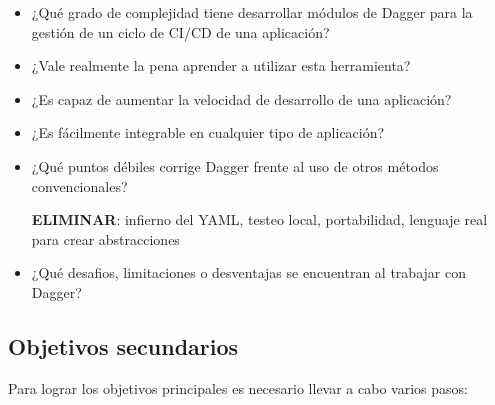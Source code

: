 \begin{itemize}
  \item ¿Qué grado de complejidad tiene desarrollar módulos de Dagger para la gestión de un ciclo de CI/CD de una aplicación?
  \item ¿Vale realmente la pena aprender a utilizar esta herramienta?
  \item ¿Es capaz de aumentar la velocidad de desarrollo de una aplicación?
  \item ¿Es fácilmente integrable en cualquier tipo de aplicación?
  \item ¿Qué puntos débiles corrige Dagger frente al uso de otros métodos convencionales?

    \textbf{ELIMINAR}: infierno del YAML, testeo local, portabilidad, lenguaje real para crear abstracciones
  \item ¿Qué desafios, limitaciones o desventajas se encuentran al trabajar con Dagger?
\end{itemize}

\subsection*{Objetivos secundarios}

Para lograr los objetivos principales es necesario llevar a cabo varios pasos:

